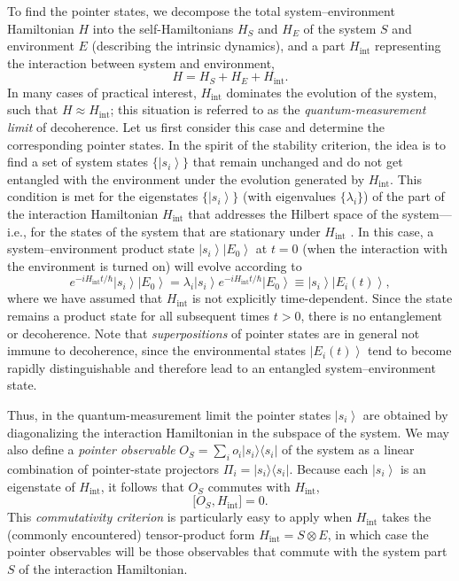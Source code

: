 \documentclass[3p,sort&compress,12pt]{elsarticle}
\newcommand{\ket}[1]{\left\vert{#1}\right\rangle}
\newcommand{\ketbra}[2]{\ensuremath{|{#1 \rangle}{\langle #2}|}}
\newcommand{\E}{\ensuremath{e}}
\newcommand{\I}{\ensuremath{i}}
\newcommand{\op}[1]{#1}
\begin{document}
To find the pointer states, we decompose the total system--environment Hamiltonian $\op{H}$ into the self-Hamiltonians $\op{H}_S$ and $\op{H}_E$ of the system $S$ and environment $E$ (describing the intrinsic dynamics), and a part $\op{H}_\text{int}$ representing the interaction between system and environment, 
%
\begin{equation}
H = \op{H}_S + \op{H}_E + \op{H}_\text{int}. 
\end{equation}
%
In many cases of practical interest, $\op{H}_\text{int}$ dominates the evolution of the system, such that $\op{H} \approx \op{H}_\text{int}$; this situation is referred to as the \emph{quantum-measurement limit} of decoherence. Let us first consider this case and determine the corresponding pointer states. In the spirit of the stability criterion, the idea is to find a set of system states $\{\ket{s_i}\}$ that remain unchanged and do not get entangled with the environment under the evolution generated by $\op{H}_\text{int}$. This condition is met for the eigenstates $\{\ket{s_i}\}$ (with eigenvalues $\{\lambda_i\}$) of the part of the interaction Hamiltonian $\op{H}_\text{int}$ that addresses the Hilbert space of the system---i.e., for the states of the system that are stationary under $\op{H}_\text{int}$ \cite{Zurek:1981:dd}. In this case, a system--environment product state $\ket{s_i}\ket{E_0}$ at $t=0$ (when the interaction with the environment is turned on) will evolve according to 
%
\begin{equation}
  \label{eq:gxlknn98ygya24}
  \E^{-\I \op{H}_\text{int} t/\hbar} \ket{s_i}\ket{E_0}=
  \lambda_i \ket{s_i}\E^{-\I \op{H}_\text{int} t/\hbar} \ket{E_0} \equiv  \ket{s_i}\ket{E_i(t)},
\end{equation}
%
where we have assumed that $\op{H}_\text{int}$ is not explicitly time-dependent. Since the state remains a product state for all subsequent times $t>0$, there is no entanglement or decoherence. Note that \emph{superpositions} of pointer states are in general not immune to decoherence, since the environmental states $\ket{E_i(t)}$ tend to become rapidly distinguishable and therefore lead to an entangled system--environment state. 

Thus, in the quantum-measurement limit the pointer states $\ket{s_i}$ are obtained by diagonalizing the interaction Hamiltonian in the subspace of the system. We may also define a \emph{pointer observable} $\op{O}_S = \sum_i o_i \ketbra{s_i}{s_i}$ of the system as a linear combination of pointer-state projectors $\op{\Pi}_i=\ketbra{s_i}{s_i}$.  Because each $\ket{s_i}$ is an eigenstate of $\op{H}_\text{int}$, it follows that $\op{O}_S$ commutes with $\op{H}_\text{int}$,
%
\begin{equation}
  \label{eq:dhvvsdnbbfvs27}
  \bigl[ \op{O}_S, \op{H}_\text{int} \bigr] = 0.
\end{equation}
%
This \emph{commutativity criterion} \cite{Zurek:1981:dd,Zurek:1982:tv} is particularly easy to apply when $\op{H}_\text{int}$ takes the (commonly encountered) tensor-product form $\op{H}_\text{int} = \op{S} \otimes \op{E}$, in which case the pointer observables will be those observables that commute with the system part $\op{S}$ of the interaction Hamiltonian. 
\end{document}
